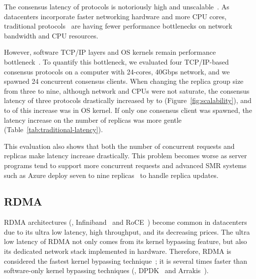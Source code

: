 The consensus latency of \paxos protocols is notoriously high and 
unscalable~\cite{zookeeper,scatter:sosp11}. As datacenters incorporate 
faster networking hardware and more CPU cores, traditional \paxos 
protocols~\cite{libpaxos,spaxos:srds12,crane:sosp15,rex:eurosys14,zookeeper} are 
having fewer performance bottlenecks on network bandwidth and CPU resources. 


However, software TCP/IP layers and OS kernels remain performance 
bottleneck~\cite{arrakis:osdi14}. To quantify this bottleneck, we evaluated 
four TCP/IP-based consensus protocols on a computer with 24-cores, 40Gbps 
network, and we spawned 24 concurrent consensus clients. When changing the 
replica group size from three to nine, although network and CPUs were not 
saturate, the consensus latency of three protocols drastically increased by 
\tradlatencyincreaselow to \tradlatencyincreasehigh 
(Figure~\ref{fig:scalability}), and \systemcostlow to \systemcosthigh of this 
increase was in OS kernel. If only one consensus client was spawned, the latency 
increase on the number of replicas was more gentle 
(Table~\ref{tab:traditional-latency}).

This evaluation also shows that both the number of concurrent requests and 
replicas make \paxos latency increase drastically. This problem becomes worse 
as server programs tend to support more concurrent requests and advanced SMR 
systems such as Azure deploy seven to nine replicas~\cite{azure:book} to handle 
replica updates.




\subsection{RDMA}\label{sec:rdma}
RDMA architectures (\eg, Infiniband~\cite{infiniband} and RoCE~\cite{roce})
become common in datacenters due to its ultra low latency, high throughput, and 
its decreasing prices. The ultra low latency of RDMA not only comes from its 
kernel bypassing feature, but also its dedicated network stack implemented in 
hardware. Therefore, RDMA is considered the fastest kernel bypassing 
technique~\cite{herd:sigcomm14,pilaf:usenix14,dare:hpdc15}; it is several times 
faster than software-only kernel bypassing techniques (\eg, DPDK~\cite{dpdk} 
and Arrakis~\cite{arrakis:osdi14}).

